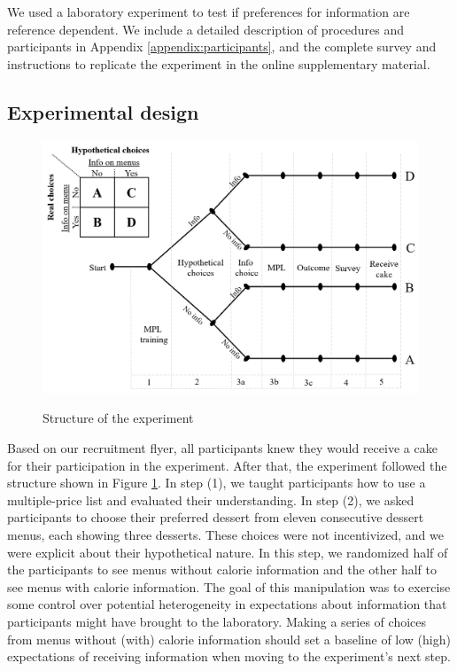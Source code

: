 
We used a laboratory experiment to test if preferences for information are reference dependent. We include a detailed description of procedures and participants in Appendix \ref{appendix:participants}, and the complete survey and instructions to replicate the experiment in the online supplementary material.

\subsection{Experimental design}

\begin{figure}[ht]
  \caption{Structure of the experiment}\label{fig:expDesign}
  \begin{center}
  {\includegraphics[width=1\textwidth]{./figures/experimentalDesign.png}}
  \end{center}
\end{figure}

Based on our recruitment flyer, all participants knew they would receive a cake for their participation in the experiment. After that, the experiment followed the structure shown in Figure \ref{fig:expDesign}. In step (1), we taught participants how to use a multiple-price list and evaluated their understanding. In step (2), we asked participants to choose their preferred dessert from eleven consecutive dessert menus, each showing three desserts. These choices were not incentivized, and we were explicit about their hypothetical nature. In this step, we randomized half of the participants to see menus without calorie information and the other half to see menus with calorie information. The goal of this manipulation was to exercise some control over potential heterogeneity in expectations about information that participants might have brought to the laboratory. Making a series of choices from menus without (with) calorie information should set a baseline of low (high) expectations of receiving information when moving to the experiment’s next step.

